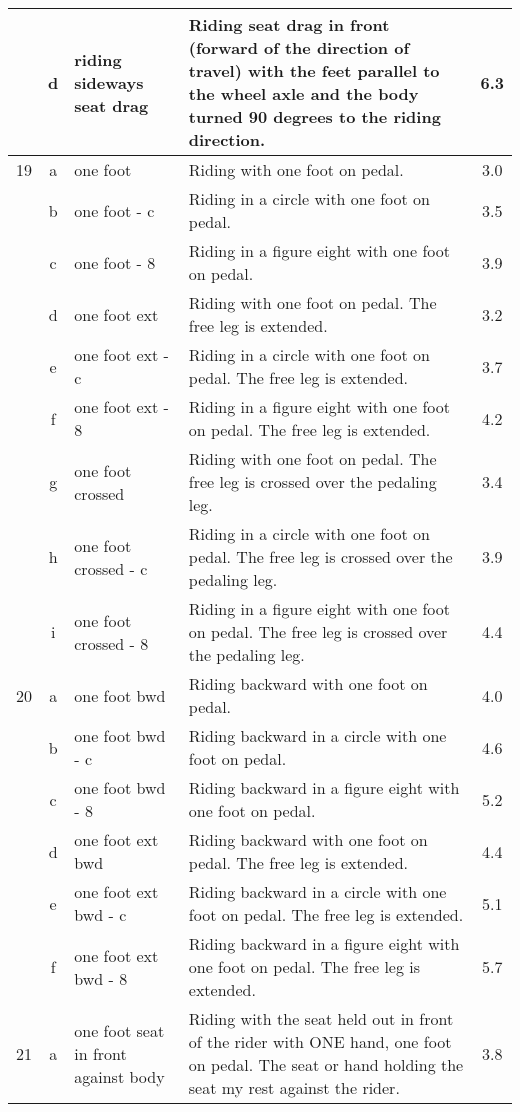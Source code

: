 \begin{longtable}{|r|c|p{4cm}|p{8cm}|c|}
\hline
  & d & riding sideways seat drag & Riding seat drag in front (forward of the direction of travel) with the feet parallel to the wheel axle and the body turned 90 degrees to the riding direction. & 6.3 \\ 
\hline
19  & a & one foot  & Riding with one foot on pedal.  & 3.0 \\ 
\hline
  & b & one foot - c  & Riding in a circle with one foot on pedal.  & 3.5 \\ 
\hline
  & c & one foot - 8  & Riding in a figure eight with one foot on pedal.  & 3.9 \\ 
\hline
  & d & one foot ext  & Riding with one foot on pedal. The free leg is extended.  & 3.2 \\ 
\hline
  & e & one foot ext - c  & Riding in a circle with one foot on pedal. The free leg is extended.  & 3.7 \\ 
\hline
  & f & one foot ext - 8  & Riding in a figure eight with one foot on pedal. The free leg is extended.  & 4.2 \\ 
\hline
  & g & one foot crossed  & Riding with one foot on pedal. The free leg is crossed over the pedaling leg. & 3.4 \\ 
\hline
  & h & one foot crossed - c  & Riding in a circle with one foot on pedal. The free leg is crossed over the pedaling leg. & 3.9 \\ 
\hline
  & i & one foot crossed - 8  & Riding in a figure eight with one foot on pedal. The free leg is crossed over the pedaling leg. & 4.4 \\ 
\hline
20  & a & one foot bwd  & Riding backward with one foot on pedal. & 4.0 \\ 
\hline
  & b & one foot bwd - c  & Riding backward in a circle with one foot on pedal. & 4.6 \\ 
\hline
  & c & one foot bwd - 8  & Riding backward in a figure eight with one foot on pedal. & 5.2 \\ 
\hline
  & d & one foot ext bwd  & Riding backward with one foot on pedal. The free leg is extended. & 4.4 \\ 
\hline
  & e & one foot ext bwd - c  & Riding backward in a circle with one foot on pedal. The free leg is extended. & 5.1 \\ 
\hline
  & f & one foot ext bwd - 8  & Riding backward in a figure eight with one foot on pedal. The free leg is extended. & 5.7 \\ 
\hline
21  & a & one foot seat in front against body & Riding with the seat held out in front of the rider with ONE hand, one foot on pedal. The seat or hand holding the seat my rest against the rider.  & 3.8 \\ 

\end{longtable}
